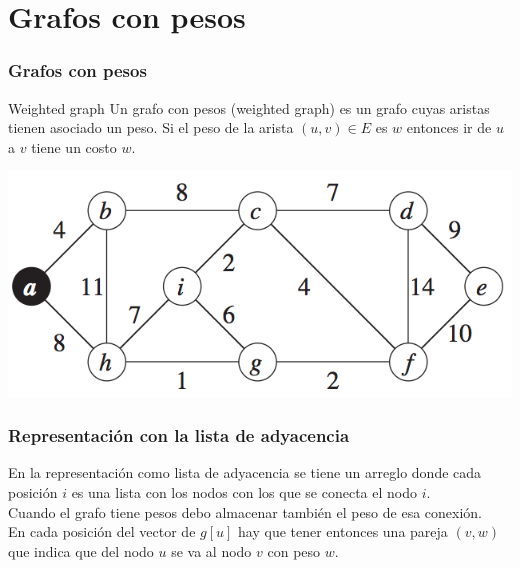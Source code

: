 \documentclass{beamer}
\begin{document}
\section {Grafos con pesos}
	\begin{frame}
		\frametitle{Grafos con pesos}
		\begin{block}{Weighted graph}
			Un grafo con pesos (weighted graph) es un grafo cuyas aristas tienen asociado un peso. Si el peso de la arista $(u, v) \in E$ es $w$ entonces ir de $u$ a $v$ tiene un costo $w$.
		\end{block}
		\begin{center}
			\includegraphics[height = 0.4\textheight]{weighted_graph.png}
		\end{center}
	\end{frame}
	
	\begin{frame}
		\frametitle{Representación con la lista de adyacencia}
		En la representación como lista de adyacencia se tiene un arreglo donde cada posición $i$ es una lista con los nodos con los que se conecta el nodo $i$.\\
		Cuando el grafo tiene pesos debo almacenar también el peso de esa conexión.\\
		En cada posición del vector de $g[u]$ hay que tener entonces una pareja $(v, w)$ que indica que del nodo $u$ se va al nodo $v$ con peso $w$.
	\end{frame}
	
\end{document}
